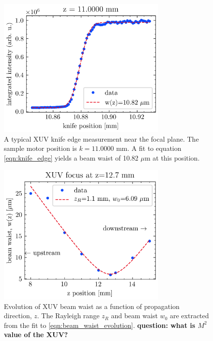 \begin{figure}
	\centering
	\includegraphics[width=0.75\textwidth]{figures/chap3/XUV_focus_knife_edge.png}
	\caption{A typical XUV knife edge measurement near the focal plane. The sample motor position is $k=11.0000$ mm. A fit to equation \cref{eqn:knife_edge} yields a beam waist of 10.82 $\mu$m at this position.}
	\label{fig:XUV_focus_knife_edge}
\end{figure}

\begin{figure}
	\centering
	\includegraphics[width=0.75\textwidth]{figures/chap3/XUV_waist_vs_k.png}
	\caption{Evolution of XUV beam waist as a function of propagation direction, $z$. The Rayleigh range $z_R$ and beam waist $w_0$ are extracted from the fit to \cref{eqn:beam_waist_evolution}. \textbf{question: what is $M^2$ value of the XUV?}}
	\label{fig:XUV_waist_vs_k}
\end{figure}


